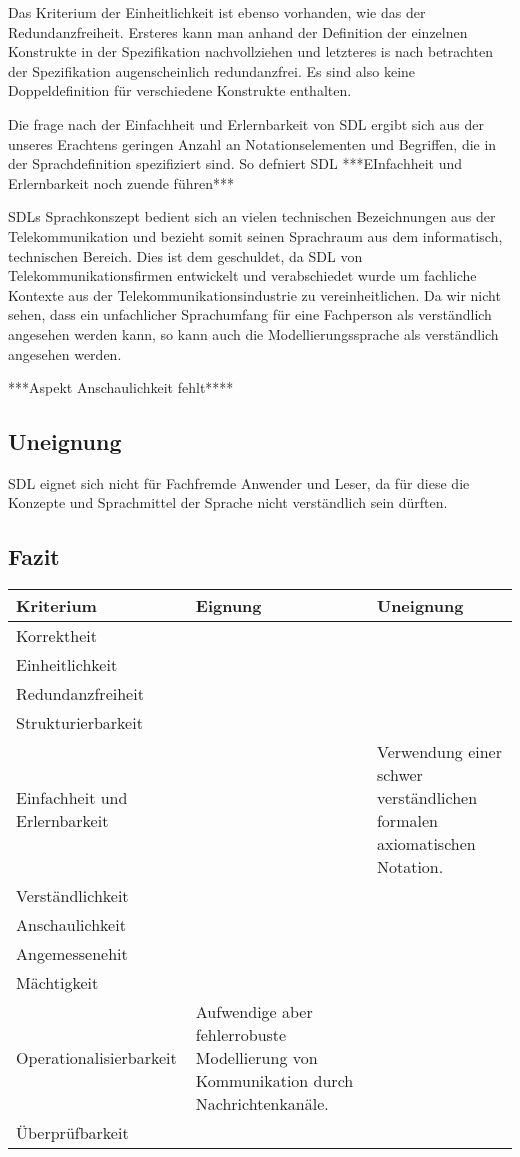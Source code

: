 Das Kriterium der Einheitlichkeit ist ebenso vorhanden, wie das der Redundanzfreiheit. Ersteres kann man anhand der Definition der einzelnen Konstrukte in der Spezifikation nachvollziehen und letzteres is nach betrachten der Spezifikation augenscheinlich redundanzfrei. Es sind also keine Doppeldefinition für verschiedene Konstrukte enthalten. 

Die frage nach der Einfachheit und Erlernbarkeit von \ac{SDL} ergibt sich aus der unseres Erachtens geringen Anzahl an Notationselementen und Begriffen, die in der Sprachdefinition spezifiziert sind. So defniert \ac{SDL} ***EInfachheit und Erlernbarkeit noch zuende führen***

\ac{SDL}s Sprachkonszept bedient sich an vielen technischen Bezeichnungen aus der Telekommunikation und bezieht somit seinen Sprachraum aus dem informatisch, technischen Bereich. Dies ist dem geschuldet, da \ac{SDL} von Telekommunikationsfirmen  entwickelt und verabschiedet wurde um fachliche Kontexte aus der Telekommunikationsindustrie zu vereinheitlichen. Da wir nicht sehen, dass ein unfachlicher Sprachumfang für eine Fachperson als verständlich angesehen werden kann, so kann auch die Modellierungssprache als verständlich angesehen werden.

***Aspekt Anschaulichkeit fehlt****

\subsection{Uneignung}
\label{scc:SDL_Uneignung}
\ac{SDL} eignet sich nicht für Fachfremde Anwender und Leser, da für diese die Konzepte und Sprachmittel der Sprache nicht verständlich sein dürften. 
\subsection{Fazit}
\label{scc:SDL_Fazit}
\begin{tabularx}{\textwidth}{|l|l|l|}
	\hline
	Kriterium & Eignung & Uneignung  \\
	\hline
	Korrektheit	& & \\
	\hline
	Einheitlichkeit & & \\
	\hline
	Redundanzfreiheit & & \\
	\hline	
	Strukturierbarkeit & & \\
	\hline
	Einfachheit und 
	Erlernbarkeit & & Verwendung einer schwer verständlichen formalen axiomatischen Notation.  \\
	\hline
	Verständlichkeit & & \\
	\hline
	Anschaulichkeit & & \\
	\hline	
	Angemessenehit 	& & \\
	\hline
	Mächtigkeit & & \\
	\hline
	Operationalisierbarkeit & Aufwendige aber fehlerrobuste	Modellierung von Kommunikation durch Nachrichtenkanäle. & \\
	\hline
	Überprüfbarkeit & & \\
	\hline
\end{tabularx} 
